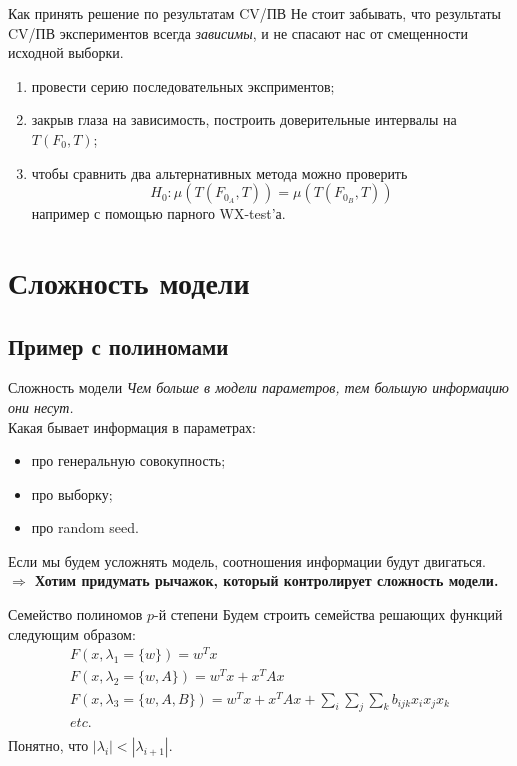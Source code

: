\documentclass[14pt, fleqn, xcolor={dvipsnames, table}]{beamer}
\begin{document}
\begin{frame}{Как принять решение по результатам CV/ПВ}
Не стоит забывать, что результаты CV/ПВ экспериментов всегда {\color{red} \em зависимы}, и не спасают нас от смещенности исходной выборки.
\small
\begin{enumerate}
  \item провести серию последовательных эксприментов;
  \item закрыв глаза на зависимость, построить доверительные интервалы на $T(F_0, T)$;
  \item чтобы сравнить два альтернативных метода можно проверить
  $$H_0: \mu\left(T(F_{0_A}, T)\right) = \mu\left(T(F_{0_B}, T)\right)$$
  например с помощью парного WX-test'а.
\end{enumerate}

\end{frame}

\section{Сложность модели}
\subsection{Пример с полиномами}

\begin{frame}{Сложность модели}{}
{\em Чем больше в модели параметров, тем большую информацию они несут.}\\
\flushleft\small
Какая бывает информация в параметрах:
\begin{itemize}
  \item про генеральную совокупность;
  \item про выборку;
  \item про random seed.
\end{itemize}
Если мы будем усложнять модель, соотношения информации будут двигаться.\\

\textbf{$\Rightarrow$ Хотим придумать рычажок, который контролирует сложность модели.}
\end{frame}

\begin{frame}{Семейство полиномов $p$-й степени}
Будем строить семейства решающих функций следующим образом:
\small
$$\begin{array}{l}
F(x, \lambda_1=\{w\}) = w^Tx \\
F(x, \lambda_2=\{w,A\}) = w^Tx + x^TAx\\
F(x, \lambda_3=\{w,A,B\}) = w^Tx + x^TAx + \sum_i\sum_j\sum_k b_{ijk} x_i x_j x_k\\
etc.\\
\end{array}$$
Понятно, что $|\lambda_i| < |\lambda_{i+1}|$.
\end{frame}
\end{document}
